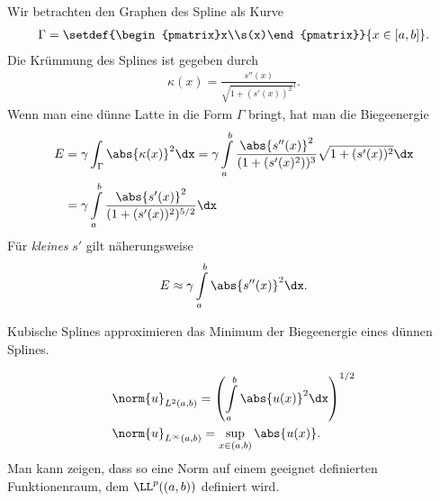 \begin{bemn}
Wir betrachten den Graphen des Spline als Kurve
\begin{align*}
\Gamma = \setdef{\begin{pmatrix}x\\s(x)\end{pmatrix}}{x\in [a,b]}.
\end{align*}
Die Krümmung des Splines ist gegeben durch
\begin{align*}
\kappa(x) = \frac{s''(x)}{\sqrt{1+(s'(x))^2}^3}.
\end{align*}
Wenn man eine dünne Latte in die Form $\Gamma$ bringt, hat man die Biegeenergie
\begin{align*}
E &= \gamma\int_\Gamma \abs{\kappa(x)}^2\dx
= \gamma \int\limits_a^b
\frac{\abs{s''(x)}^2}{(1+(s'(x)^2))^3}\sqrt{1+(s'(x))^2}\dx
 \\ &
= \gamma \int\limits_a^b \frac{\abs{s'(x)}^2}{(1+(s'(x))^2)^{5/2}}\dx
\end{align*}
Für \textit{kleines} $s'$ gilt näherungsweise
\begin{align*}
E \approx \gamma \int\limits_a^b \abs{s''(x)}^2\dx.
\end{align*}
\begin{corn}
Kubische Splines approximieren das Minimum der Biegeenergie eines dünnen
Splines.\fishhere\maphere
\end{corn}
\end{bemn}

\begin{bemn}[Notation.]
\begin{align*}
&\norm{u}_{L^2(a,b)} = \left(\int\limits_a^b \abs{u(x)}^2\dx \right)^{1/2}\\
&\norm{u}_{L^\infty(a,b)} = \sup\limits_{x\in (a,b)} \abs{u(x)}.
\end{align*}
Man kann zeigen, dass so eine Norm auf einem geeignet definierten
Funktionenraum, dem $\LL^p((a,b))$ definiert wird.\maphere
\end{bemn}

